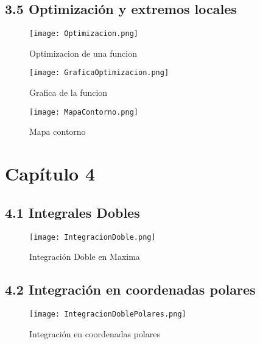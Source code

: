 \documentclass[a4 paper]{article}
\numberwithin{equation}{section}
\newcommand{\0}{\mathbf{0}}
\begin{document}

\subsection*{3.5 Optimizaci\'on y extremos locales}

\begin{figure}[!ht]
  \centering
      \texttt{[image: Optimizacion.png]}
  \caption{Optimizacion de una funcion}
\end{figure}

\begin{figure}[!ht]
  \centering
      \texttt{[image: GraficaOptimizacion.png]}
  \caption{Grafica de la funcion}
\end{figure}
\newpage
\begin{figure}[!ht]
  \centering
      \texttt{[image: MapaContorno.png]}
  \caption{Mapa contorno}
\end{figure}


\section*{Cap\'itulo 4}
\subsection*{4.1 Integrales Dobles}

\begin{figure}[!ht]
  \centering
      \texttt{[image: IntegracionDoble.png]}
  \caption{Integraci\'on Doble en Maxima}
\end{figure}


\subsection*{4.2 Integraci\'on en coordenadas polares}

\begin{figure}[!ht]
  \centering
      \texttt{[image: IntegracionDoblePolares.png]}
  \caption{Integraci\'on en coordenadas polares}
\end{figure}
\end{document}
